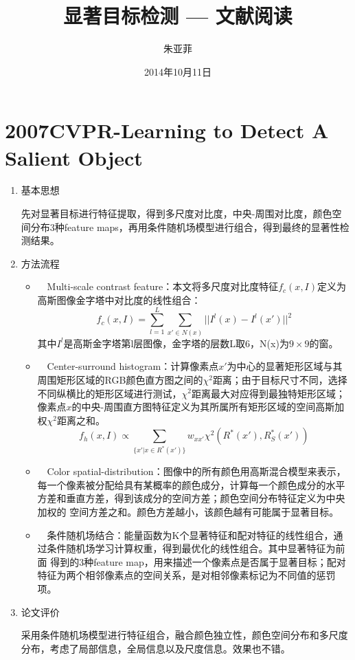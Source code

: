 \documentclass[a4paper,12pt]{article}
\title{显著目标检测 --- 文献阅读}
\author{朱亚菲}
\date{2014年10月11日}
\begin{document}
\maketitle

\section{2007CVPR-Learning to Detect A Salient Object}

\begin{enumerate}
\item 基本思想

先对显著目标进行特征提取，得到多尺度对比度，中央-周围对比度，颜色空间分布3种feature maps，再用条件随机场模型进行组合，得到最终的显著性检测结果。

\item 方法流程
\begin{itemize}
\item　Multi-scale contrast feature：本文将多尺度对比度特征$f_c(x,I)$定义为高斯图像金字塔中对比度的线性组合：
\begin{displaymath}
f_c(x,I)=\sum_{l=1}^L \sum_{x'\in N(x)}||I^l(x)-I^l(x')||^2
\end{displaymath}
其中$I^l$是高斯金字塔第l层图像，金字塔的层数L取6，N(x)为$9\times9$的窗。
\item　Center-surround histogram：计算像素点$x'$为中心的显著矩形区域与其周围矩形区域的RGB颜色直方图之间的$\chi^2$距离；由于目标尺寸不同，选择不同纵横比的矩形区域进行测试，$\chi^2$距离最大对应得到最独特矩形区域；像素点$x$的中央-周围直方图特征定义为其所属所有矩形区域的空间高斯加权$\chi^2$距离之和。
\begin{displaymath}
f_h(x,I)\propto \sum_{\{x'|x\in R^*(x')\}} w_{xx'} \chi^2(R^*(x'),R^*_S(x'))
\end{displaymath}
\item　Color spatial-distribution：图像中的所有颜色用高斯混合模型来表示，每一个像素被分配给具有某概率的颜色成分，计算每一个颜色成分的水平方差和垂直方差，得到该成分的空间方差；颜色空间分布特征定义为中央加权的 空间方差之和。颜色方差越小，该颜色越有可能属于显著目标。
\item　条件随机场结合：能量函数为K个显著特征和配对特征的线性组合，通 过条件随机场学习计算权重，得到最优化的线性组合。其中显著特征为前面 得到的3种feature map，用来描述一个像素点是否属于显著目标；配对特征为两个相邻像素点的空间关系，是对相邻像素标记为不同值的惩罚项。
\end{itemize}

\item 论文评价

采用条件随机场模型进行特征组合，融合颜色独立性，颜色空间分布和多尺度分布，考虑了局部信息，全局信息以及尺度信息。效果也不错。
\end{enumerate}
\end{document}
